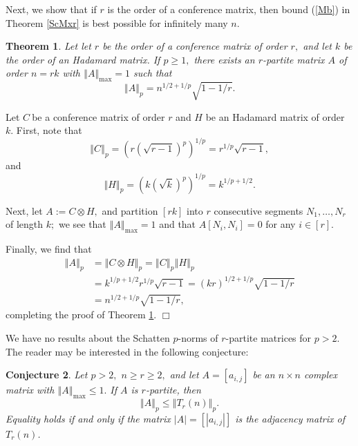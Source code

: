 \documentclass[12pt]{article}%
\newtheorem{theorem}{Theorem}[section]
\newtheorem{conjecture}[theorem]{Conjecture}
\newenvironment{proof}[1][Proof]{\noindent{\textbf {#1}  }}  {\hfill$\Box$\bigskip}
\begin{document}
Next, we show that if $r$ is the order of a conference matrix, then bound
(\ref{Mb}) in Theorem \ref{ScMxr} is best possible for infinitely many $n$.

\begin{theorem}
\label{Scth3}Let let $r$ be the order of a conference matrix of order $r,$ and
let $k$ be the order of an Hadamard matrix. If $p\geq1,$ there exists an
$r$-partite matrix $A$ of order $n=rk$ with $\left\Vert A\right\Vert _{\max
}=1$ such that
\[
\left\Vert A\right\Vert _{p}=n^{1/2+1/p}\sqrt{1-1/r}.
\]

\end{theorem}

\begin{proof}
Let $C\ $be a conference matrix of order $r$ and $H$ be an Hadamard matrix of
order $k.$ First, note that
\[
\left\Vert C\right\Vert _{p}=\left(  r\left(  \sqrt{r-1}\right)  ^{p}\right)
^{1/p}=r^{1/p}\sqrt{r-1},
\]
and%
\[
\left\Vert H\right\Vert _{p}=\left(  k\left(  \sqrt{k}\right)  ^{p}\right)
^{1/p}=k^{1/p+1/2}.
\]


Next, let $A:=C\otimes H,$ and partition $\left[  rk\right]  $ into $r$
consecutive segments $N_{1},\ldots,N_{r}$ of length $k;$ we see that
$\left\Vert A\right\Vert _{\max}=1$ and that $A\left[  N_{i},N_{i}\right]  =0$
for any $i\in\left[  r\right]  .$

Finally, we find that
\begin{align*}
\left\Vert A\right\Vert _{p}  &  =\left\Vert C\otimes H\right\Vert
_{p}=\left\Vert C\right\Vert _{p}\left\Vert H\right\Vert _{p}\\
&  =k^{1/p+1/2}r^{1/p}\sqrt{r-1}=\left(  kr\right)  ^{1/2+1/p}\sqrt{1-1/r}\\
&  =n^{1/2+1/p}\sqrt{1-1/r},
\end{align*}
completing the proof of Theorem \ref{Scth3}.
\end{proof}

We have no results about the Schatten $p$-norms of $r$-partite matrices for
$p>2$. The reader may be interested in the following conjecture:

\begin{conjecture}
Let $p>2,$ $n\geq r\geq2,$ and let $A=\left[  a_{i,j}\right]  $ be an $n\times
n$ complex matrix with $\left\Vert A\right\Vert _{\max}\leq1.$ If $A$ is
$r$-partite, then%
\[
\left\Vert A\right\Vert _{p}\leq\left\Vert T_{r}\left(  n\right)  \right\Vert
_{p}.
\]
Equality holds if and only if the matrix $\left\vert A\right\vert =\left[
\left\vert a_{i,j}\right\vert \right]  $ is the adjacency matrix of
$T_{r}\left(  n\right)  $.
\end{conjecture}
\end{document}
